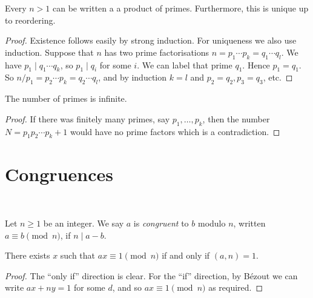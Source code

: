 \documentclass[a4paper, 10pt, twocolumn]{amsart}
\begin{document}
\begin{theorem} 
  Every $n>1$ can be written a a product of primes. Furthermore, this is unique up to reordering.
\end{theorem}
\begin{proof}
  Existence follows easily by strong induction. For uniqueness we also use induction. Suppose that $n$ has two prime factorisations $n=p_1 \cdots p_k=q_1 \cdots q_l$. We have $p_1 \mid q_1 \cdots q_k$, so $p_1 \mid q_i$ for some $i$. We can label that prime $q_1$. Hence $p_1=q_1$. So $n / p_1=p_2 \cdots p_k=q_2 \cdots q_l$, and by induction $k=l$ and $p_2=q_2, p_3=q_3$, etc.
\end{proof}


\begin{theorem}[Euclid]
    The number of primes is infinite.
\end{theorem}
\begin{proof}
  If there was finitely many primes, say $p_1, \dots, p_k$, then the number $N = p_1 p_2 \cdots p_k + 1$ would have no prime factors which is a contradiction.
\end{proof}

\section{Congruences}

\ 

\begin{definition}
Let $n \geq 1$ be an integer. We say $a$ is \emph{congruent} to $b$ modulo $n$, written $a \equiv b \pmod{n}$, if $n \mid a - b$.
\end{definition}

\begin{theorem}
  There exists $x$ such that $ax \equiv 1 \pmod{n}$ if and only if $(a, n) = 1$.
\end{theorem}
\begin{proof}
    The ``only if'' direction is clear. For the ``if'' direction, by Bézout we can write $ax + ny = 1$ for some $d$, and so $ax \equiv 1 \pmod{n}$ as required.
\end{proof}
\end{document}
